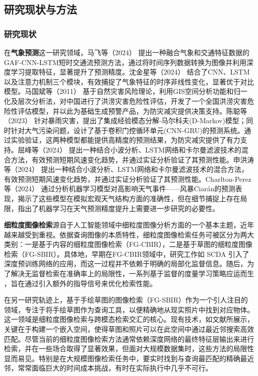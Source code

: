 \subsection{研究现状与方法}

\subsubsection{研究现状}

在\textbf{气象预测}这一研究领域，马飞等（2024）\cite{JYGC20240415002} 提出一种融合气象和交通特征数据的GAF-CNN-LSTM短时交通流预测方法，通过将时间序列数据转换为图像并利用深度学习提取特征，显著提升了预测精度。沈金星等（2024）\cite{HJKZ2024011600J} 结合了CNN、LSTM以及注意力机制三个模块，有效捕捉了气象特征的时序非线性变化，显著优于对比模型。马国斌等（2011）\cite{ZHXU201103002} 基于自然灾害风险理论，利用GIS空间分析功能和归一化及层次分析法，对中国进行了洪涝灾害危险性评估，开发了一个全国洪涝灾害危险性评估模型，并以此为基础生成预警产品，为防灾减灾提供决策支持。陈聪等（2023）\cite{1023751652ch} 针对暴雨灾害，提出了集成经验模态分解-马尔科夫(D-Markov)模型；同时针对大气污染问题，设计了基于卷积门控循环单元(CNN-GRU)的预测系统。通过实验验证，这两种模型都能提供高精度的预测结果，为防灾减灾提供了有力支持。屈峰等（2024）\cite{HBYD202401011} 提出一种结合小波分析、LSTM网络和卡尔曼滤波技术的混合方法，有效预测短期风速变化趋势，并通过实证分析验证了其预测性能。申洪涛等（2024）\cite{DLJS202401002} 提出一种结合小波分析、LSTM网络和卡尔曼滤波技术的混合方法，有效预测短期风速变化趋势，并通过实证分析验证了其预测性能。Charlton-Perez 等（2024）\cite{charltonperez2024ai} 通过分析机器学习模型对高影响天气事件——风暴Ciarán的预测表现，揭示了这些模型在模拟宏观天气结构方面的准确性，但在细节捕捉上存在局限，指出了机器学习在天气预测精度提升上需要进一步研究的必要性。


\textbf{细粒度图像检索}源自于人工智能领域中细粒度图像分析方面\cite{wei2021finegrained}的一个基本主题，近年越来越受到重视\cite{solving9157668}\cite{cui2020exchnet}\cite{zheng2019towards}。依据查询图像的本质特性，细粒度图像检索任务可被区分为两大类别：一是基于内容的细粒度图像检索（FG-CBIR），二是基于草图的细粒度图像检索（FG-SBIR）。具体地，早期在FG-CBIR领域中，研究工作如 SCDA \cite{wei2017selective} 引入了深度预训练网络的应用，而这一过程并不依赖于明确的局部化监督信息。随后，为了解决无监督检索在准确率上的局限性，一系列基于监督的度量学习策略应运而生 \cite{HoIH8237325}，旨在通过引入额外的指导信号来优化检索性能。

在另一研究轨迹上，基于手绘草图的图像检索（FG-SBIR）作为一个引人注目的领域，专注于将手绘草图作为查询工具，以便精确地从现实照片中找到对应物体。这一领域是细粒度图像检索与跨模态检索交汇的核心。现有技术，如文献\cite{Yu7780462SMTS}\cite{song8237854DSA}所展示，关键在于构建一个嵌入空间，使得草图和照片可以在此空间中通过最近邻搜索高效匹配。尽管当前的细粒度图像检索方法通常依赖深度网络的最终特征层输出来进行检索，并在一些场合取得了显著效果，但面对大规模数据集时，这些方法的局限性显而易见。特别是在大规模图像检索任务中，要实时找到与查询最匹配的精确最近邻，常常面临巨大的时间成本挑战，有时在实际执行中几乎不可行。

